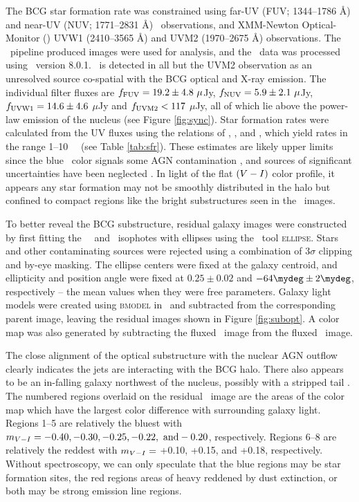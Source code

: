\documentclass[11pt, preprint]{aastex}
\begin{document}
The BCG star formation rate was constrained using far-UV (FUV;
1344--1786 \AA) and near-UV (NUV; 1771--2831 \AA)
\galex\ observations, and XMM-Newton Optical-Monitor (\xom) UVW1
(2410--3565 \AA) and UVM2 (1970--2675 \AA) observations. The
\galex\ pipeline produced images were used for analysis, and the
\xom\ data was processed using \sas\ version 8.0.1. \rbs\ is detected
in all but the UVM2 observation as an unresolved source co-spatial
with the BCG optical and X-ray emission. The individual filter fluxes
are $f_{\rm{FUV}} = 19.2 \pm 4.8 ~\mu$Jy, $f_{\rm{NUV}} = 5.9 \pm 2.1
~\mu$Jy, $f_{\rm{UVW1}} = 14.6 \pm 4.6$ $\mu$Jy and $f_{\rm{UVM2}} <
117$ $\mu$Jy, all of which lie above the power-law emission of the
nucleus (see Figure \ref{fig:sync}). Star formation rates were
calculated from the UV fluxes using the relations of
\citet{kennicutt2}, \citet{2006ApJ...642..775M}, and
\citet{salim2007}, which yield rates in the range 1--10 ~\msolpy\ (see
Table \ref{tab:sfr}). These estimates are likely upper limits since
the blue \galex\ color signals some AGN contamination
\citep{2005AJ....130.1022A}, and sources of significant uncertainties
have been neglected \citep[\eg][]{1992ApJ...388..310K,
  2004AJ....127.2002K, hicksuv, 2010MNRAS.tmp..626G}. In light of the
flat $(V-I)$ color profile, it appears any star formation may
not be smoothly distributed in the halo but confined to compact
regions like the bright substructures seen in the \hst\ images.

To better reveal the BCG substructure, residual galaxy images were
constructed by first fitting the \hst\ \myv\ and \myi\ isophotes with
ellipses using the \iraf\ tool {\textsc{ellipse}}. Stars and other
contaminating sources were rejected using a combination of $3\sigma$
clipping and by-eye masking. The ellipse centers were fixed at the
galaxy centroid, and ellipticity and position angle were fixed at
$0.25 \pm 0.02$ and $-64\mydeg \pm 2\mydeg$, respectively -- the mean
values when they were free parameters. Galaxy light models were
created using {\textsc{bmodel}} in \iraf\ and subtracted from the
corresponding parent image, leaving the residual images shown in
Figure \ref{fig:subopt}. A color map was also generated by subtracting
the fluxed \myi\ image from the fluxed \myv\ image.

The close alignment of the optical substructure with the nuclear AGN
outflow clearly indicates the jets are interacting with the BCG
halo. There also appears to be an in-falling galaxy northwest of the
nucleus, possibly with a stripped tail \citep[see][for
  example]{2007ApJ...671..190S}. The numbered regions overlaid on the
residual \myv\ image are the areas of the color map which have the
largest color difference with surrounding galaxy light. Regions 1--5
are relatively the bluest with $m_{V-I} = -0.40, -0.30, -0.25,
-0.22, ~\rm{and} -0.20$, respectively. Regions 6--8 are relatively the
reddest with $m_{V-I} =$ +0.10, +0.15, and +0.18,
respectively. Without spectroscopy, we can only speculate that the
blue regions may be star formation sites, the red regions areas of
heavy reddened by dust extinction, or both may be strong emission line
regions.
\end{document}
